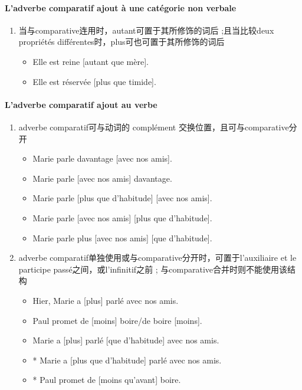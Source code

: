 \documentclass[UTF8]{report}
\begin{document}
\paragraph{L’adverbe comparatif ajout à une catégorie non verbale}

\begin{enumerate}
    \item 当与comparative连用时，autant可置于其所修饰的词后 ;且当比较deux propriétés différentes时，plus可也可置于其所修饰的词后
    \begin{itemize}
        \item Elle est reine [autant que mère].
        \item Elle est réservée [plus que timide].
    \end{itemize}
\end{enumerate}

\paragraph{L’adverbe comparatif ajout au verbe}
\begin{enumerate}
    \item adverbe comparatif可与动词的 complément 交换位置，且可与comparative分开
    \begin{itemize}
        \item Marie parle davantage [avec nos amis].
        \item Marie parle [avec nos amis] davantage.
        \item Marie parle [plus que d’habitude] [avec nos amis].
        \item Marie parle [avec nos amis] [plus que d’habitude].
        \item Marie parle plus [avec nos amis] [que d’habitude].
    \end{itemize}
    \item adverbe comparatif单独使用或与comparative分开时，可置于l’auxiliaire et le participe passé之间，或l’infinitif之前 ; 与comparative合并时则不能使用该结构
    \begin{itemize}
        \item Hier, Marie a [plus] parlé avec nos amis.
        \item Paul promet de [moins] boire/de boire [moins].
        \item Marie a [plus] parlé [que d’habitude] avec nos amis.
        \item * Marie a [plus que d’habitude] parlé avec nos amis.
        \item * Paul promet de [moins qu’avant] boire.
    \end{itemize}
\end{enumerate}
\end{document}
